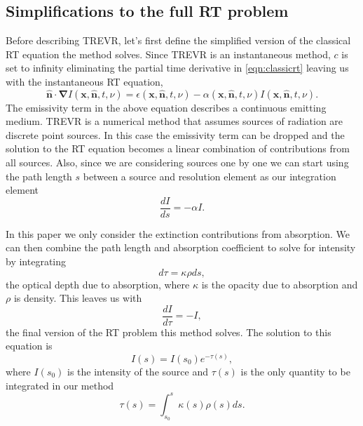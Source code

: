 \documentclass[fleq,usenatbib]{mnras}
\newcommand{\acro}{TREVR}
\begin{document}
\subsection{Simplifications to the full RT problem}
Before describing \acro{}, let's first define the 
simplified version of the classical RT equation the method solves. Since 
\acro{} is an instantaneous method, $c$ is set to infinity eliminating the 
partial time derivative in \ref{eqn:classicrt} leaving us with the 
instantaneous RT equation,
\begin{equation} \label{infcrt}
\mathbf{\hat{n} \cdot \nabla} I\left(\mathbf{x}, \mathbf{\hat{n}}, t, 
\nu\right) = \epsilon\left(\mathbf{x}, \mathbf{\hat{n}}, t, \nu\right) - 
\alpha\left(\mathbf{x}, \mathbf{\hat{n}}, t, \nu\right) 
I\left(\mathbf{x}, \mathbf{\hat{n}}, t, \nu\right).
\end{equation}
The emissivity term in the above equation describes a continuous emitting 
medium. \acro{} is a numerical method that assumes sources of radiation are 
discrete point sources. In this case the emissivity term can be dropped and 
the solution to the RT equation becomes a linear combination of contributions 
from all sources. Also, since we are considering sources one by one we can 
start using the path length $s$ between a source and resolution element as our 
integration element
\begin{equation}
\label{eqn:combtransfer}
\frac{dI}{ds} = -\alpha I.
\end{equation}

In this paper we only consider the extinction contributions from 
absorption. We can then combine the path length and absorption coefficient to 
solve for intensity by integrating 
\begin{equation}
\label{eqn:dtau}
d\tau = \kappa \rho ds, 
\end{equation}
the optical depth due to absorption, where $\kappa$ is the opacity due to 
absorption and $\rho$ is density. This leaves us with
\begin{equation}
\label{eqn:absorbtransfer}
\frac{dI}{d\tau} = -I,
\end{equation}
the final version of the RT problem this method solves. The solution to this 
equation is 
\begin{equation}
\label{eqn:ient}
I(s) = I(s_0)e^{-\tau(s)},
\end{equation}
where $I(s_0)$ is the intensity of the source and $\tau(s)$ is the only
quantity to be integrated in our method
\begin{equation}
\label{eqn:tauint}
\tau(s) = \int_{s_0}^s \kappa(s) \rho(s) ds.
\end{equation}
\end{document}
